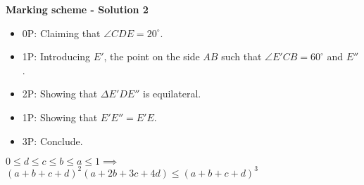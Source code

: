 {\textbf{Marking scheme - Solution 2} 

\begin{itemize}
    \item 0P: Claiming that $\angle CDE=20^\circ.$
    \item 1P: Introducing $E'$, the point on the side $AB$ such that $\angle E'CB=60^\circ$ and $E''$.
    \item 2P: Showing that $\Delta E'DE''$ is equilateral.
    \item 1P: Showing that $E'E''=E'E$.
    \item 3P: Conclude.
\end{itemize}

}
$0 \le d \le c \le b \le a \le 1 \implies$ \\
$(a+b+c+d)^2(a+2b+3c+4d) \le (a+b+c+d)^3$